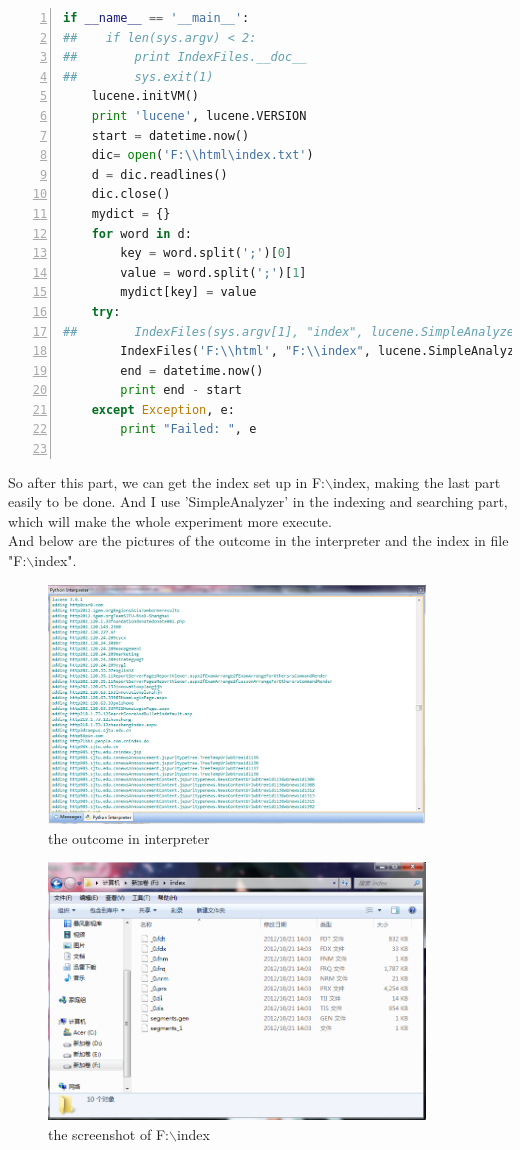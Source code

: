 \documentclass{article}
\begin{document}
\begin{lstlisting}[language=python,numbers=left,frame=leftline]
if __name__ == '__main__':
##    if len(sys.argv) < 2:
##        print IndexFiles.__doc__
##        sys.exit(1)
    lucene.initVM()
    print 'lucene', lucene.VERSION
    start = datetime.now()
    dic= open('F:\\html\index.txt')
    d = dic.readlines()
    dic.close()
    mydict = {}
    for word in d:
        key = word.split(';')[0]
        value = word.split(';')[1]
        mydict[key] = value
    try:
##        IndexFiles(sys.argv[1], "index", lucene.SimpleAnalyzer(lucene.Version.LUCENE_CURRENT))
        IndexFiles('F:\\html', "F:\\index", lucene.SimpleAnalyzer(lucene.Version.LUCENE_CURRENT))
        end = datetime.now()
        print end - start
    except Exception, e:
        print "Failed: ", e


\end{lstlisting}
So after this part, we can get the index set up in F:$\backslash$index, making the last part easily to be done. And I use 'SimpleAnalyzer' in the indexing and searching part, which will make the whole experiment more execute.\\
And below are the pictures of the outcome in the interpreter and the index in file "F:$\backslash$index".\\
\begin{figure}[htbp]
\centering
\includegraphics[width=10cm]{3.png}
\caption{the outcome in interpreter}
\end{figure}
\begin{figure}[htbp]
\centering
\includegraphics[width=10cm]{4.png}
\caption{the screenshot of F:$\backslash$index}
\end{figure}
\end{document}

